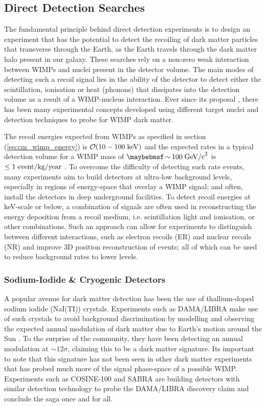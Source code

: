 {\subsection{Direct Detection Searches}
\label{subsec:direct_searches}

The fundamental principle behind direct detection experiments is to design an experiment that has the potential to detect the recoiling of dark matter particles that transverse through the Earth, as the Earth travels through the dark matter halo present in our galaxy. These searches rely on a non-zero weak interaction between WIMPs and nuclei present in the detector volume. The main modes of detecting such a recoil signal lies in the ability of the detector to detect either the scintillation, ionisation or heat (phonons) that dissipates into the detection volume as a result of a WIMP-nucleus interaction. Ever since its proposal \cite{Detectability_of_dm}, there has been many experimental concepts developed using different target nuclei and detection techniques to probe for WIMP dark matter. 

The recoil energies expected from WIMPs as specified in section (\ref{eq:cm_wimp_energy}) is $\mathcal{O}(10-100 \; \text{keV})$ and the expected rates in a typical detection volume for a WIMP mass of $\sim 100 \; \MathText{GeV/c}^2$ is $\leq 1 \; \text{event/kg/year}$ \cite{Baudis_2012}. To overcome the difficulty of detecting such rate events, many experiments aim to build detectors at ultra-low background levels, especially in regions of energy-space that overlay a WIMP signal; and often, install the detectors in deep underground facilities. To detect recoil energies at keV-scale or below, a combination of signals are often used in reconstructing the energy deposition from a recoil medium, i.e. scintillation light and ionisation, or other combinations. Such an approach can allow for experiments to distinguish between different interactions, such as electron recoils (ER) and nuclear recoils (NR) and improve 3D position reconstruction of events; all of which can be used to reduce background rates to lower levels. 

\subsubsection{Sodium-Iodide \& Cryogenic Detectors}
\label{subsec:other_detectors}

A popular avenue for dark matter detection has been the use of thallium-doped sodium iodide (NaI(TI)) crystals. Experiments such as DAMA/LIBRA make use of such crystals to avoid background discrimination by modelling and observing the expected annual modulation of dark matter due to Earth's motion around the Sun \cite{dama_libra, dama_libra_new}. To the surprise of the community, they have been detecting an annual modulation at $\sim12\sigma$, claiming this to be a dark matter signature. Its important to note that this signature has not been seen in other dark matter experiments that has probed much more of the signal phase-space of a possible WIMP. Experiments such as COSINE-100 \cite{cosine_100} and SABRA \cite{sabre} are building detectors with similar detection technology to probe the DAMA/LIBRA discovery claim and conclude the saga once and for all. 

}
